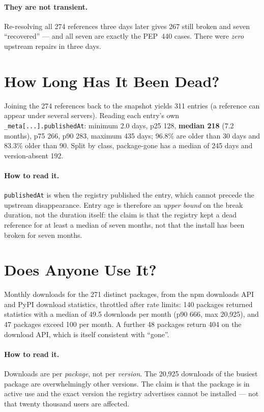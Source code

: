 \documentclass[acmsmall,screen,review,anonymous]{acmart}
\begin{document}
\paragraph{They are not transient.} Re-resolving all 274 references three days later gives
267 still broken and seven ``recovered'' --- and all seven are exactly the PEP~440 cases.
There were \emph{zero} upstream repairs in three days.

\section{How Long Has It Been Dead?}
Joining the 274 references back to the snapshot yields 311 entries (a reference can appear
under several servers). Reading each entry's own
\texttt{\_meta[...].publishedAt}: minimum 2.0 days, p25 128, \textbf{median 218} (7.2
months), p75 266, p90 283, maximum 435 days; 96.8\% are older than 30 days and 83.3\%
older than 90. Split by class, package-gone has a median of 245 days and version-absent
192.

\paragraph{How to read it.} \texttt{publishedAt} is when the registry published the entry,
which cannot precede the upstream disappearance. Entry age is therefore an \emph{upper
bound} on the break duration, not the duration itself: the claim is that the registry kept
a dead reference for at least a median of seven months, not that the install has been
broken for seven months.

\section{Does Anyone Use It?}
Monthly downloads for the 271 distinct packages, from the npm downloads API and PyPI
download statistics, throttled after rate limits: 140 packages returned statistics with a
median of 49.5 downloads per month (p90 666, max 20{,}925), and 47 packages exceed 100 per
month. A further 48 packages return 404 on the download API, which is itself consistent
with ``gone''.

\paragraph{How to read it.} Downloads are per \emph{package}, not per \emph{version}. The
20{,}925 downloads of the busiest package are overwhelmingly other versions. The claim is
that the package is in active use and the exact version the registry advertises cannot be
installed --- not that twenty thousand users are affected.
\end{document}
